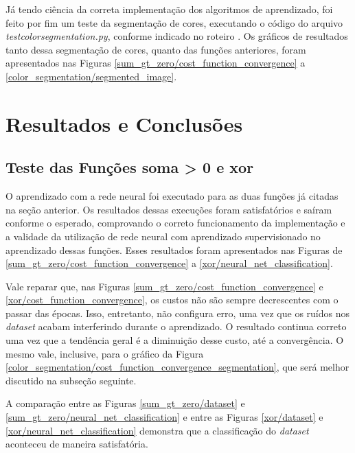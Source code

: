 \documentclass[conference]{IEEEtran}
\begin{document}
Já tendo ciência da correta implementação dos algoritmos de aprendizado, foi feito por fim um teste da segmentação de cores, executando o código do arquivo \textit{test\underline{\space}color\underline{\space}segmentation.py}, conforme indicado no roteiro \cite{roteiro}. Os gráficos de resultados tanto dessa segmentação de cores, quanto das funções anteriores, foram apresentados nas Figuras \ref{sum_gt_zero/cost_function_convergence} a \ref{color_segmentation/segmented_image}.

\section{Resultados e Conclusões}

\subsection{Teste das Funções soma > 0 e xor}

O aprendizado com a rede neural foi executado para as duas funções já citadas na seção anterior. Os resultados dessas execuções foram satisfatórios e saíram conforme o esperado, comprovando o correto funcionamento da implementação e a validade da utilização de rede neural com aprendizado supervisionado no aprendizado dessas funções. Esses resultados foram apresentados nas Figuras de \ref{sum_gt_zero/cost_function_convergence} a \ref{xor/neural_net_classification}.

Vale reparar que, nas Figuras \ref{sum_gt_zero/cost_function_convergence} e \ref{xor/cost_function_convergence}, os custos não são sempre decrescentes com o passar das épocas. Isso, entretanto, não configura erro, uma vez que os ruídos nos \textit{dataset} acabam interferindo durante o aprendizado. O resultado continua correto uma vez que a tendência geral é a diminuição desse custo, até a convergência. O mesmo vale, inclusive, para o gráfico da Figura \ref{color_segmentation/cost_function_convergence_segmentation}, que será melhor discutido na subseção seguinte.

A comparação entre as Figuras \ref{sum_gt_zero/dataset} e \ref{sum_gt_zero/neural_net_classification} e entre as Figuras \ref{xor/dataset} e \ref{xor/neural_net_classification} demonstra que a classificação do \textit{dataset} aconteceu de maneira satisfatória.
\end{document}
